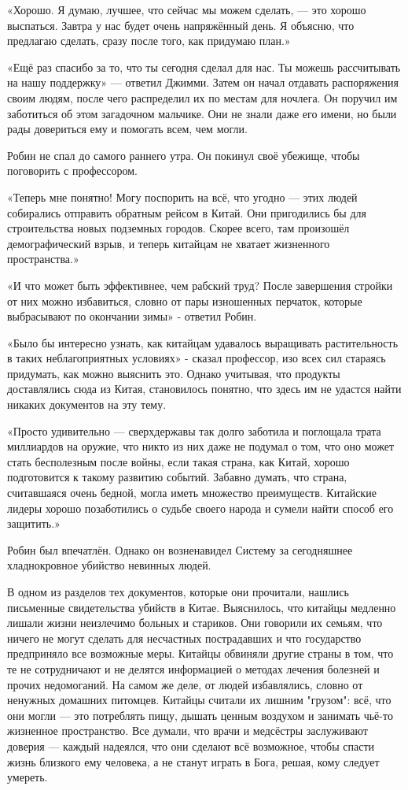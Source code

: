 \documentclass[a5paper, 9pt,
final, openany, twoside=true]{memoir}
\begin{document}
«Хорошо. Я думаю, лучшее, что сейчас мы можем сделать, — это хорошо выспаться. Завтра у нас будет очень напряжённый день. Я объясню, что предлагаю сделать, сразу после того, как придумаю план.»

«Ещё раз спасибо за то, что ты сегодня сделал для нас. Ты можешь рассчитывать на нашу поддержку» — ответил Джимми. Затем он начал отдавать распоряжения своим людям, после чего распределил их по местам для ночлега. Он поручил им заботиться об этом загадочном мальчике. Они не знали даже его имени, но были рады довериться ему и помогать всем, чем могли.\bigskip

Робин не спал до самого раннего утра. Он покинул своё убежище, чтобы поговорить с профессором.

«Теперь мне понятно! Могу поспорить на всё, что угодно — этих людей собирались отправить обратным рейсом в Китай. Они пригодились бы для строительства новых подземных городов. Скорее всего, там произошёл демографический взрыв, и теперь китайцам не хватает жизненного пространства.»

«И что может быть эффективнее, чем рабский труд? После завершения стройки от них можно избавиться, словно от пары изношенных перчаток, которые выбрасывают по окончании зимы» - ответил Робин.

«Было бы интересно узнать, как китайцам удавалось выращивать растительность в таких неблагоприятных условиях» - сказал профессор, изо всех сил стараясь придумать, как можно выяснить это. Однако учитывая, что продукты доставлялись сюда из Китая, становилось понятно, что здесь им не удастся найти никаких документов на эту тему.

«Просто удивительно — сверхдержавы так долго заботила и поглощала трата миллиардов на оружие, что никто из них даже не подумал о том, что оно может стать бесполезным после войны, если такая страна, как Китай, хорошо подготовится к такому развитию событий. Забавно думать, что страна, считавшаяся очень бедной, могла иметь множество преимуществ. Китайские лидеры хорошо позаботились о судьбе своего народа и сумели найти способ его защитить.»

Робин был впечатлён. Однако он возненавидел Систему за сегодняшнее хладнокровное убийство невинных людей.\bigskip

В одном из разделов тех документов, которые они прочитали, нашлись письменные свидетельства убийств в Китае. Выяснилось, что китайцы медленно лишали жизни неизлечимо больных и стариков. Они говорили их семьям, что ничего не могут сделать для несчастных пострадавших и что государство предприняло все возможные меры. Китайцы обвиняли другие страны в том, что те не сотрудничают и не делятся информацией о методах лечения болезней и прочих недомоганий. На самом же деле, от людей избавлялись, словно от ненужных домашних питомцев. Китайцы считали их лишним "грузом": всё, что они могли — это потреблять пищу, дышать ценным воздухом и занимать чьё-то жизненное пространство. Все думали, что врачи и медсёстры заслуживают доверия — каждый надеялся, что они сделают всё возможное, чтобы спасти жизнь близкого ему человека, а не станут играть в Бога, решая, кому следует умереть.\bigskip
\end{document}
